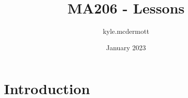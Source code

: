 \documentclass{article}
\title{MA206 - Lessons}
\author{kyle.mcdermott }
\date{January 2023}
\begin{document}
\maketitle

\section{Introduction}
\end{document}
